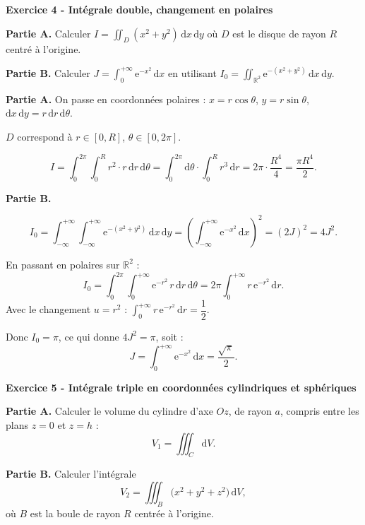 \documentclass[12pt,a4paper]{article}
\begin{document}
\begin{boiteexercice}
\textbf{Exercice 4 - Intégrale double, changement en polaires}\niveau{\moyen}

\textbf{Partie A.} Calculer $\displaystyle I = \iint_D (x^2 + y^2)\,\mathrm{d}x\,\mathrm{d}y$ où $D$ est le disque de rayon $R$ centré à l'origine.

\textbf{Partie B.} Calculer $\displaystyle J = \int_0^{+\infty} \mathrm{e}^{-x^2}\,\mathrm{d}x$ en utilisant $I_0 = \iint_{\mathbb{R}^2} \mathrm{e}^{-(x^2+y^2)}\,\mathrm{d}x\,\mathrm{d}y$.
\end{boiteexercice}

\begin{boitecorrige}
\textbf{Partie A.} On passe en coordonnées polaires : $x = r\cos\theta$, $y = r\sin\theta$, $\mathrm{d}x\,\mathrm{d}y = r\,\mathrm{d}r\,\mathrm{d}\theta$.

$D$ correspond à $r \in [0, R]$, $\theta \in [0, 2\pi]$.

\[
I = \int_0^{2\pi}\!\int_0^R r^2 \cdot r\,\mathrm{d}r\,\mathrm{d}\theta
= \int_0^{2\pi}\mathrm{d}\theta \cdot \int_0^R r^3\,\mathrm{d}r
= 2\pi \cdot \frac{R^4}{4} = \frac{\pi R^4}{2}.
\]

\textbf{Partie B.}

\[
I_0 = \int_{-\infty}^{+\infty}\!\int_{-\infty}^{+\infty} \mathrm{e}^{-(x^2+y^2)}\,\mathrm{d}x\,\mathrm{d}y
= \left(\int_{-\infty}^{+\infty} \mathrm{e}^{-x^2}\,\mathrm{d}x\right)^2 = (2J)^2 = 4J^2.
\]

En passant en polaires sur $\mathbb{R}^2$ :
\[
I_0 = \int_0^{2\pi}\!\int_0^{+\infty} \mathrm{e}^{-r^2}\,r\,\mathrm{d}r\,\mathrm{d}\theta
= 2\pi \int_0^{+\infty} r\,\mathrm{e}^{-r^2}\,\mathrm{d}r.
\]
Avec le changement $u = r^2$ : $\displaystyle\int_0^{+\infty} r\,\mathrm{e}^{-r^2}\,\mathrm{d}r = \dfrac{1}{2}$.

Donc $I_0 = \pi$, ce qui donne $4J^2 = \pi$, soit :
\[
\boxed{J = \int_0^{+\infty} \mathrm{e}^{-x^2}\,\mathrm{d}x = \frac{\sqrt{\pi}}{2}.}
\]
\end{boitecorrige}

\begin{boiteexercice}
\textbf{Exercice 5 - Intégrale triple en coordonnées cylindriques et sphériques}\niveau{\moyen}

\textbf{Partie A.} Calculer le volume du cylindre d'axe $Oz$, de rayon $a$, compris entre les plans $z = 0$ et $z = h$ :
\[
V_1 = \iiint_C \mathrm{d}V.
\]

\textbf{Partie B.} Calculer l'intégrale
\[
V_2 = \iiint_B \bigl(x^2 + y^2 + z^2\bigr)\,\mathrm{d}V,
\]
où $B$ est la boule de rayon $R$ centrée à l'origine.
\end{boiteexercice}
\end{document}
